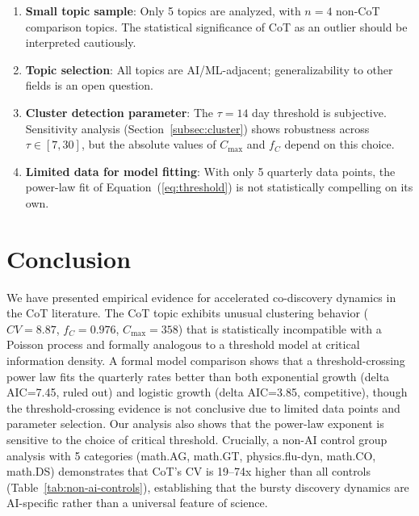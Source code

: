 \documentclass[12pt]{article}
\begin{document}
\begin{enumerate}
    \item \textbf{Small topic sample}: Only 5 topics are analyzed, with $n=4$ non-CoT comparison topics. The statistical significance of CoT as an outlier should be interpreted cautiously.
    \item \textbf{Topic selection}: All topics are AI/ML-adjacent; generalizability to other fields is an open question.
    \item \textbf{Cluster detection parameter}: The $\tau = 14$ day threshold is subjective. Sensitivity analysis (Section~\ref{subsec:cluster}) shows robustness across $\tau \in [7, 30]$, but the absolute values of $C_{\max}$ and $f_C$ depend on this choice.
    \item \textbf{Limited data for model fitting}: With only 5 quarterly data points, the power-law fit of Equation~(\ref{eq:threshold}) is not statistically compelling on its own.
\end{enumerate}

\section{Conclusion}

We have presented empirical evidence for accelerated co-discovery dynamics in the CoT literature. The CoT topic exhibits unusual clustering behavior ($CV = 8.87$, $f_C = 0.976$, $C_{\max} = 358$) that is statistically incompatible with a Poisson process and formally analogous to a threshold model at critical information density. A formal model comparison shows that a threshold-crossing power law fits the quarterly rates better than both exponential growth (delta AIC=7.45, ruled out) and logistic growth (delta AIC=3.85, competitive), though the threshold-crossing evidence is not conclusive due to limited data points and parameter selection. Our analysis also shows that the power-law exponent is sensitive to the choice of critical threshold. Crucially, a non-AI control group analysis with 5 categories (math.AG, math.GT, physics.flu-dyn, math.CO, math.DS) demonstrates that CoT's CV is 19--74x higher than all controls (Table~\ref{tab:non-ai-controls}), establishing that the bursty discovery dynamics are AI-specific rather than a universal feature of science.
\end{document}
